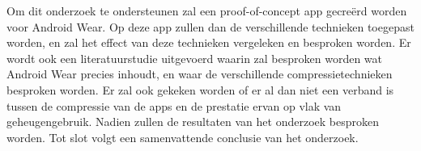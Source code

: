 



Om dit onderzoek te ondersteunen zal een proof-of-concept app gecreërd worden voor Android Wear. Op deze app zullen dan de verschillende technieken toegepast worden, en zal het effect van deze technieken vergeleken en besproken worden. Er wordt ook een literatuurstudie uitgevoerd waarin zal besproken worden wat Android Wear precies inhoudt, en waar de verschillende compressietechnieken besproken worden. Er zal ook gekeken worden of er al dan niet een verband is tussen de compressie van de apps en de prestatie ervan op vlak van geheugengebruik. Nadien zullen de resultaten van het onderzoek besproken worden. Tot slot volgt een samenvattende conclusie van het onderzoek. 


